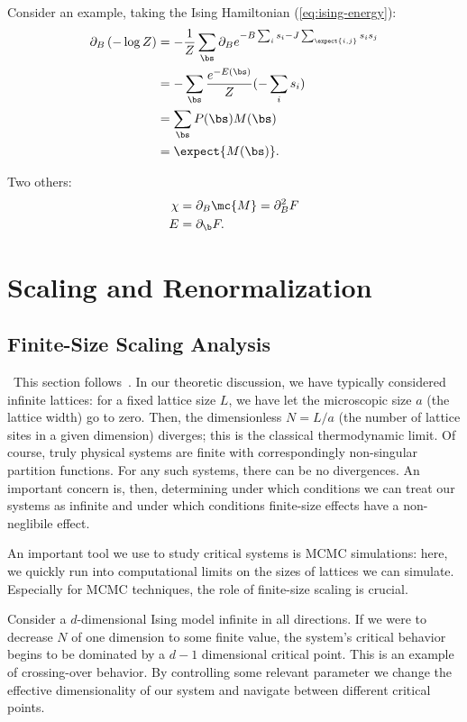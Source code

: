 Consider an example, taking the Ising Hamiltonian
(\ref{eq:ising-energy}):
\begin{align}%
  \partial_B \left(-\log Z\right)&=-\frac{1}{Z}\sum_{\bs}\partial_Be^{-B \sum_i s_i - J \sum_{\expect{i,j}} s_i s_j}\\
                                 &=-\sum_{\bs}\frac{e^{-E(\bs)}}{Z} (-\sum_i s_i)\\
                                 &=\sum_{\bs}P(\bs)M(\bs) \\
                                 &=\expect{M(\bs)}.\label{eq:magnetization-as-derivative}
\end{align}%

Two others:
\begin{align}%
  \chi&=\partial_B \mc{M}=\partial_B^2F\\
  E&=\partial_\b F.
\end{align}

\chapter{Scaling and Renormalization}
\section{Finite-Size Scaling Analysis}\label{sec:finite-size-scaling}\
This section follows~\cite{fssa}. In our theoretic discussion, we have typically considered infinite
lattices: for a fixed lattice size $L$, we have let the microscopic
size $a$ (the lattice width) go to zero. Then, the dimensionless
$N=L/a$ (the number of lattice sites in a given dimension) diverges;
this is the classical thermodynamic limit.  Of course, truly physical
systems are finite with correspondingly non-singular partition
functions. For any such systems, there can be no divergences. An
important concern is, then, determining under which conditions we can
treat our systems as infinite and under which conditions finite-size
effects have a non-neglibile effect.

An important tool we use to study critical systems is MCMC
simulations: here, we quickly run into computational limits on the
sizes of lattices we can simulate. Especially for MCMC techniques, the
role of finite-size scaling is crucial.

Consider a $d$-dimensional Ising model infinite in all directions. If
we were to decrease $N$ of one dimension to some finite value, the
system's critical behavior begins to be dominated by a $d-1$
dimensional critical point. This is an example of crossing-over
behavior. By controlling some relevant parameter we change the
effective dimensionality of our system and navigate between different
critical points.

